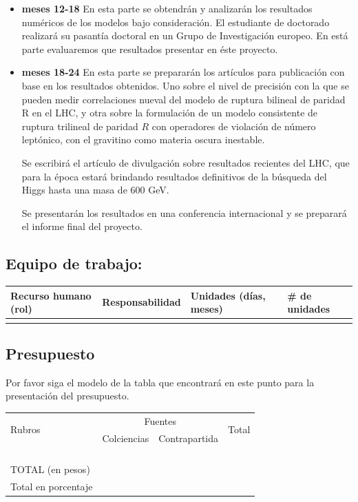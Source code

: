 \begin{itemize}
\item \textbf{meses 12-18} En esta parte se obtendrán y analizarán los
  resultados numéricos de los modelos bajo consideración. El
  estudiante de doctorado realizará su pasantía doctoral en un Grupo
  de Investigación europeo. En está parte evaluaremos que resultados
  presentar en éste proyecto.

\item \textbf{meses 18-24} En esta parte se prepararán los artículos
  para publicación con base en los resultados obtenidos. Uno sobre el
  nivel de precisión con la que se pueden medir correlaciones nueval
  del modelo de ruptura bilineal de paridad R en el LHC, y otra sobre
  la formulación de un modelo consistente de ruptura trilineal de
  paridad $R$ con operadores de violación de número leptónico, con el
  gravitino como materia oscura inestable.


  Se escribirá el artículo de divulgación sobre resultados recientes
  del LHC, que para la época estará brindando resultados definitivos
  de la búsqueda del Higgs hasta una masa de 600 GeV.

  Se presentarán los resultados en una conferencia internacional y se
  preparará el informe final del proyecto.
\end{itemize}

\subsection{Equipo de trabajo:}
\begin{tabular}{|l|l|l|l|}\hline
Recurso humano (rol)& Responsabilidad& Unidades (días, meses)& \# de unidades\\\hline
&&&\\\hline
\end{tabular}

\subsection{Presupuesto}
\begin{instrucciones}
  Por favor siga el modelo de la tabla que encontrará en este punto para la presentación del presupuesto.
\end{instrucciones}
\begin{tabular}{|l|l|l|l|}\hline
  \multirow{2}{*}{Rubros}&\multicolumn{2}{c}{Fuentes}\vline&\multirow{2}{*}{Total}\\
  \cline{2-3} & Colciencias & Contrapartida & \\\hline 
 & & &\\\hline
 & & &\\\hline
 & & &\\\hline
 & & &\\\hline
TOTAL (en pesos) & & &\\\hline
Total en porcentaje & & &\\\hline
\end{tabular}

